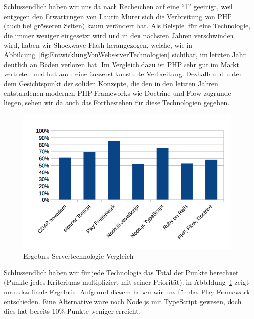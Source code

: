 			Schlussendlich haben wir uns da nach Recherchen auf eine "`1"' geeinigt, weil entgegen den Erwartungen von Laurin Murer sich die Verbreitung von PHP (auch bei grösseren Seiten) kaum verändert hat.
			Als Beispiel für eine Technologie, die immer weniger eingesetzt wird und in den nächsten Jahren verschwinden wird, haben wir Shockwave Flash herangezogen, welche, wie in Abbildung~\ref{fig:EntwicklungVonWebserverTechnologien} sichtbar, im letzten Jahr deutlich an Boden verloren hat.
			Im Vergleich dazu ist PHP sehr gut im Markt vertreten und hat auch eine äusserst konstante Verbreitung.
			Deshalb und unter dem Gesichtspunkt der soliden Konzepte, 
			die den in den letzten Jahren entstandenen modernen PHP Frameworks wie Doctrine und Flow zugrunde liegen, sehen wir da auch das Fortbestehen für diese Technologien gegeben.
			
			\begin{figure}[H]
				\begin{minipage}[b]{\linewidth}
					\includegraphics[width=\textwidth]{media/spreadsheets/ServertechnologieVergleichVergleichDerTechnologienDiagramm.png}
					\centering
					\caption{Ergebnis Servertechnologie-Vergleich}
					\label{fig:ErgebnisServertechnologieVergleich}
				\end{minipage}
			\end{figure}
			
			Schlussendlich haben wir für jede Technologie das Total der Punkte berechnet (Punkte jedes Kriteriums multipliziert mit seiner Priorität). in Abbildung~\ref{fig:ErgebnisServertechnologieVergleich} zeigt man das finale Ergebnis. Aufgrund diesem haben wir uns für das Play Framework entschieden. Eine Alternative wäre noch Node.js mit TypeScript gewesen, doch dies hat bereits 10\%-Punkte weniger erreicht.
			
